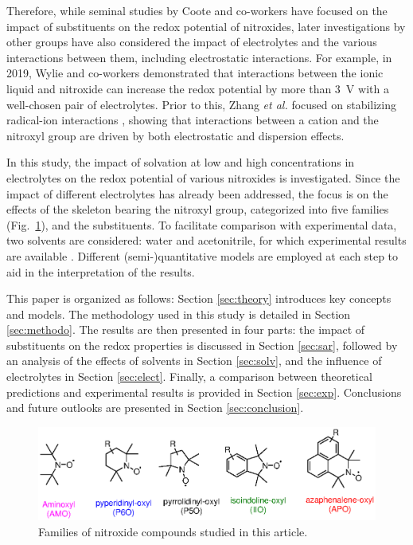 \documentclass[review,preprint]{elsarticle}
\begin{document}
Therefore, while seminal studies by Coote and co-workers \cite{hodgsonOneElectronOxidationReduction2007,blincoExperimentalTheoreticalStudies2008} have focused on the impact of substituents on the redox potential of nitroxides, later investigations by other groups have also considered the impact of electrolytes and the various interactions between them, including electrostatic interactions. For example, in 2019, Wylie and co-workers \cite{wylieImprovedPerformanceAllOrganic2019a,wylieIncreasedStabilityNitroxide2019b} demonstrated that interactions between the ionic liquid and nitroxide can increase the redox potential by more than \SI{3}{\volt} with a well-chosen pair of electrolytes. Prior to this, Zhang \textit{et al.} focused on stabilizing radical-ion interactions \cite{zhangInteractionsImidazoliumBasedIonic2016,zhangEffectHeteroatomFunctionality2018}, showing that interactions between a cation and the nitroxyl group are driven by both electrostatic and dispersion effects.


In this study, the impact of solvation at low and high concentrations in electrolytes on the redox potential of various nitroxides is investigated. Since the impact of different electrolytes has already been addressed, the focus is on the effects of the skeleton bearing the nitroxyl group, categorized into five families (Fig.~\ref{fig:families}), and the substituents. To facilitate comparison with experimental data, two solvents are considered: water and acetonitrile, for which experimental results are available \cite{morrisChemicalElectrochemicalReduction1991,goldsteinStructureActivityRelationship2006,blincoExperimentalTheoreticalStudies2008,zhangEffectHeteroatomFunctionality2018}. Different (semi-)quantitative models are employed at each step to aid in the interpretation of the results.

This paper is organized as follows: Section \ref{sec:theory} introduces key concepts and models. The methodology used in this study is detailed in Section \ref{sec:methodo}. The results are then presented in four parts: the impact of substituents on the redox properties is discussed in Section \ref{sec:sar}, followed by an analysis of the effects of solvents in Section \ref{sec:solv}, and the influence of electrolytes in Section \ref{sec:elect}. Finally, a comparison between theoretical predictions and experimental results is provided in Section \ref{sec:exp}. Conclusions and future outlooks are presented in Section \ref{sec:conclusion}.

\begin{figure}[!h]
	\centering
	\includegraphics[width=\linewidth]{Figure2}
	\caption{Families of nitroxide compounds studied in this article.}
	\label{fig:families}
\end{figure}
\end{document}
